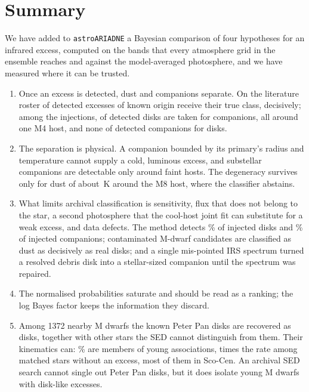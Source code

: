 \documentclass{aa}
\newcommand{\ariadne}{\texttt{astroARIADNE}}
\begin{document}
\section{Summary}
\label{sec:summary}

We have added to \ariadne{} a Bayesian comparison of four hypotheses for an
infrared excess, computed on the bands that every atmosphere grid in the ensemble
reaches and against the model-averaged photosphere, and we have measured where it
can be trusted.

\begin{enumerate}
  \item Once an excess is detected, dust and companions separate. On the
        literature roster \rosDCok{} of \rosDC{} detected excesses of known origin receive
        their true class, decisively; among the injections, \injDiskAsCompDet{} of \injDiskDet{}
        detected disks are taken for companions, all around one M4 host, and
        none of \injCompDet{} detected companions for disks.
  \item The separation is physical. A companion bounded by its primary's radius
        and temperature cannot supply a cold, luminous excess, and substellar
        companions are detectable only around faint hosts. The degeneracy
        survives only for dust of about \injVBwarmT\,K around the M8 host, where the
        classifier abstains.
  \item What limits archival classification is sensitivity, flux that does not
        belong to the star, a second photosphere that the cool-host joint fit
        can substitute for a weak excess, and data defects. The method detects
        \injDiskFlagPctInt\% of injected
        disks and \injCompFlagPct\% of injected companions; contaminated M-dwarf candidates are
        classified as dust as decisively as real disks; and a single mis-pointed
        IRS spectrum turned a resolved debris disk into a stellar-sized companion
        until the spectrum was repaired.
  \item The normalised probabilities saturate and should be read as a ranking;
        the log Bayes factor keeps the information they discard.
  \item Among 1372 nearby M dwarfs the known Peter Pan disks are recovered as
        disks, together with \svPoolOther{} other stars the SED cannot distinguish from
        them. Their kinematics can: \banPoolPct\% are members of young associations,
        \banRatio{} times the rate among matched stars without an excess, most of them
        in Sco-Cen. An archival SED search cannot single out Peter Pan disks,
        but it does isolate young M dwarfs with disk-like excesses.
\end{enumerate}
\end{document}
